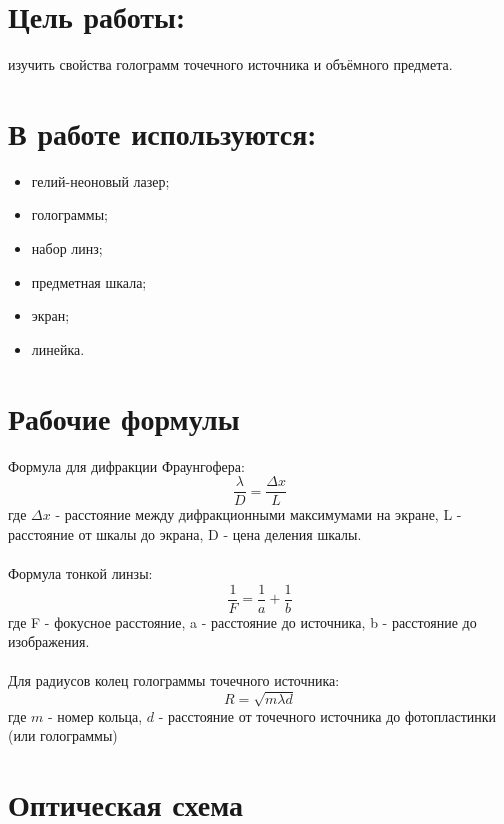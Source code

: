 \documentclass[a4paper, 12pt]{article}
\begin{document}
\section*{Цель работы:}

\noindent изучить свойства голограмм точечного источника и объёмного предмета.

\section*{В работе используются: }
\begin{itemize}
\item гелий-неоновый лазер; 
\item голограммы; 
\item набор линз; 
\item предметная шкала;
\item экран;
\item линейка.
\end{itemize}	

\section*{Рабочие формулы}  




\noindent Формула для дифракции Фраунгофера:
\begin{equation}
\frac{\lambda}{D }= \frac{\Delta x}{L}
\end{equation}
\noindent где $\Delta x$ - расстояние между дифракционными максимумами на экране, L -  расстояние от шкалы до экрана, D - цена деления шкалы.
\\
\\
\noindent Формула тонкой линзы:
\begin{equation}
\frac{1}{F} = \frac{1}{a} +  \frac{1}{b}
\end{equation}
\noindent где F - фокусное расстояние, a - расстояние до источника, b - расстояние до изображения.
\\
\\
\noindent Для радиусов колец голограммы точечного источника:
\begin{equation}
R = \sqrt{m\lambda d}
\end{equation}
\noindent где $m$ - номер кольца, $d$ - расстояние от точечного источника до фотопластинки (или голограммы)

\section*{Оптическая схема}
\end{document}
